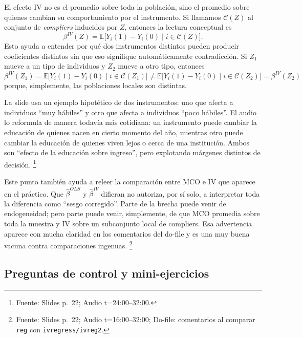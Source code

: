 \documentclass[11pt]{article}
\newcommand{\q}[1]{``#1''}
\newcommand{\E}{\mathbb{E}}
\newcommand{\source}[2]{\footnote{Fuente: Slides p.~#1; Audio t=#2.}}
\newcommand{\sourced}[3]{\footnote{Fuente: Slides p.~#1; Audio t=#2; Do-file: #3.}}
\begin{document}
El efecto IV no es el promedio sobre toda la población, sino el promedio sobre quienes cambian su comportamiento por el instrumento. Si llamamos \(\mathcal{C}(Z)\) al conjunto de \emph{compliers} inducidos por \(Z\), entonces la lectura conceptual es
\[
\beta^{IV}(Z)=\E\big[Y_i(1)-Y_i(0)\mid i\in \mathcal{C}(Z)\big].
\]
Esto ayuda a entender por qué dos instrumentos distintos pueden producir coeficientes distintos sin que eso signifique automáticamente contradicción. Si \(Z_1\) mueve a un tipo de individuos y \(Z_2\) mueve a otro tipo, entonces
\[
\boxed{
\beta^{IV}(Z_1)
=
\E\big[Y_i(1)-Y_i(0)\mid i\in \mathcal{C}(Z_1)\big]
\neq
\E\big[Y_i(1)-Y_i(0)\mid i\in \mathcal{C}(Z_2)\big]
=
\beta^{IV}(Z_2)
}
\]
porque, simplemente, las poblaciones locales son distintas.

La slide usa un ejemplo hipotético de dos instrumentos: uno que afecta a individuos \q{muy hábiles} y otro que afecta a individuos \q{poco hábiles}. El audio lo reformula de manera todavía más cotidiana: un instrumento puede cambiar la educación de quienes nacen en cierto momento del año, mientras otro puede cambiar la educación de quienes viven lejos o cerca de una institución. Ambos son \q{efecto de la educación sobre ingreso}, pero explotando márgenes distintos de decisión. \source{22}{24:00--32:00}

Este punto también ayuda a releer la comparación entre MCO e IV que aparece en el práctico. Que \(\hat\beta^{OLS}\) y \(\hat\beta^{IV}\) difieran no autoriza, por sí solo, a interpretar toda la diferencia como \q{sesgo corregido}. Parte de la brecha puede venir de endogeneidad; pero parte puede venir, simplemente, de que MCO promedia sobre toda la muestra y IV sobre un subconjunto local de compliers. Esa advertencia aparece con mucha claridad en los comentarios del do-file y es una muy buena vacuna contra comparaciones ingenuas. \sourced{22}{16:00--32:00}{comentarios al comparar \texttt{reg} con \texttt{ivregress/ivreg2}}

\subsection{Preguntas de control y mini-ejercicios}
\end{document}
